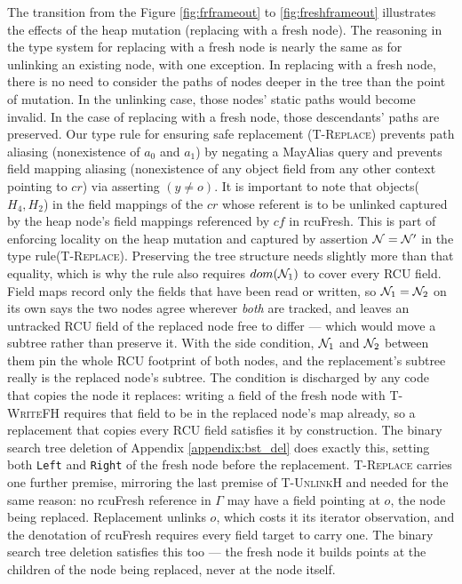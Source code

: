 The transition from the Figure \ref{fig:frframeout} to \ref{fig:freshframeout} illustrates the effects of the heap mutation (replacing with a fresh node). The reasoning in the type system for replacing with a fresh node is nearly the same as for unlinking an existing node, with one exception.
In replacing with a fresh node, there is no need to consider the paths of nodes deeper in the tree than the point of mutation.  In the unlinking case, those nodes' static paths would become invalid.  In the case of replacing with a fresh node, those descendants' paths are preserved.
Our type rule for ensuring safe replacement (\textsc{T-Replace}) prevents path aliasing (nonexistence of $a_0$ and $a_1$) by negating a \textsf{MayAlias} query and prevents field mapping aliasing (nonexistence of any object field from any other context pointing to $cr$) via asserting $(y\neq o)$. It is important to note that objects($H_4,H_2$) in the field mappings of the $cr$ whose referent is to be unlinked captured by the heap node's field mappings referenced by $cf$ in \textsf{rcuFresh}. This is part of enforcing locality on the heap mutation and captured by assertion $\mathcal{N} = \mathcal{N}'$ in the type rule(\textsc{T-Replace}).
Preserving the tree structure needs slightly more than that equality, which is why the rule also requires $dom(\mathcal{N}_1)$ to cover every \textsf{RCU} field.  Field maps record only the fields that have been read or written, so $\mathcal{N}_1 = \mathcal{N}_2$ on its own says the two nodes agree wherever \emph{both} are tracked, and leaves an untracked \textsf{RCU} field of the replaced node free to differ --- which would move a subtree rather than preserve it.  With the side condition, $\mathcal{N}_1$ and $\mathcal{N}_2$ between them pin the whole \textsf{RCU} footprint of both nodes, and the replacement's subtree really is the replaced node's subtree.  The condition is discharged by any code that copies the node it replaces: writing a field of the fresh node with \textsc{T-WriteFH} requires that field to be in the replaced node's map already, so a replacement that copies every \textsf{RCU} field satisfies it by construction.  The binary search tree deletion of Appendix \ref{appendix:bst_del} does exactly this, setting both \texttt{Left} and \texttt{Right} of the fresh node before the replacement.
\textsc{T-Replace} carries one further premise, mirroring the last premise of \textsc{T-UnlinkH} and needed for the same reason: no \textsf{rcuFresh} reference in $\Gamma$ may have a field pointing at $o$, the node being replaced.  Replacement unlinks $o$, which costs it its \textsf{iterator} observation, and the denotation of \textsf{rcuFresh} requires every field target to carry one.  The binary search tree deletion satisfies this too --- the fresh node it builds points at the children of the node being replaced, never at the node itself.
